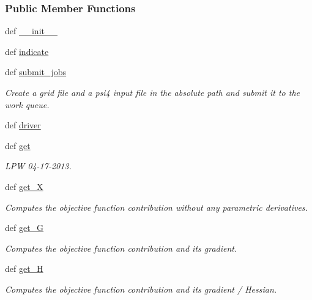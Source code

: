 \subsubsection*{Public Member Functions}
\begin{DoxyCompactItemize}
\item 
def \hyperlink{classforcebalance_1_1psi4io_1_1RDVR3__Psi4_afa204152dedeaf62137dd3f30e5f86ae}{\-\_\-\-\_\-init\-\_\-\-\_\-}
\item 
def \hyperlink{classforcebalance_1_1psi4io_1_1RDVR3__Psi4_a27735c91ca9ae70cb32552396a8485ac}{indicate}
\item 
def \hyperlink{classforcebalance_1_1psi4io_1_1RDVR3__Psi4_a728adb334e4ad6e26200c265fc2f351a}{submit\-\_\-jobs}
\begin{DoxyCompactList}\small\item\em Create a grid file and a psi4 input file in the absolute path and submit it to the work queue. \end{DoxyCompactList}\item 
def \hyperlink{classforcebalance_1_1psi4io_1_1RDVR3__Psi4_a8c4cf7a59ef8714519631145669a5df9}{driver}
\item 
def \hyperlink{classforcebalance_1_1psi4io_1_1RDVR3__Psi4_a70936cb704ab5df307013cc6aa5b85c8}{get}
\begin{DoxyCompactList}\small\item\em L\-P\-W 04-\/17-\/2013. \end{DoxyCompactList}\item 
def \hyperlink{classforcebalance_1_1target_1_1Target_a606dd136f195c267c05a2455405e5949}{get\-\_\-\-X}
\begin{DoxyCompactList}\small\item\em Computes the objective function contribution without any parametric derivatives. \end{DoxyCompactList}\item 
def \hyperlink{classforcebalance_1_1target_1_1Target_afa8cc38c8bba8861c072e789717aa049}{get\-\_\-\-G}
\begin{DoxyCompactList}\small\item\em Computes the objective function contribution and its gradient. \end{DoxyCompactList}\item 
def \hyperlink{classforcebalance_1_1target_1_1Target_a1d2ee27fe86a09769c1816af23b09adb}{get\-\_\-\-H}
\begin{DoxyCompactList}\small\item\em Computes the objective function contribution and its gradient / Hessian. \end{DoxyCompactList}\item 

\end{DoxyCompactItemize}
